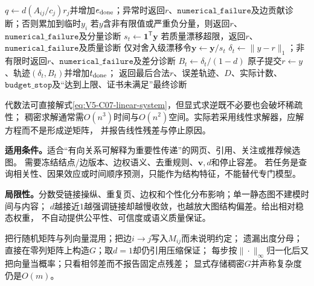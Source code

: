 \begin{AlgorithmContract}
\begin{algorithm}[tbp]
{{    $q\leftarrow d(A_{ij}/c_j)r_j$并增加$e_{\rm done}$；异常时返回$r$、$\mathtt{numerical\_failure}$及边贡献诊断；否则累加到临时$y_i$\;
  }
  若$y$含非有限值或严重负分量，则返回$r$、$\mathtt{numerical\_failure}$及分量诊断\;
  $s_t\leftarrow\boldsymbol1^{\mathsf T}\boldsymbol y$\;
  若质量漂移超限，返回$r$、$\mathtt{numerical\_failure}$及质量诊断\;
  仅对舍入级漂移令$\boldsymbol y\leftarrow\boldsymbol y/s_t$\;
  $\delta_t\leftarrow\|y-r\|_1$；非有限时返回$r$、$\mathtt{numerical\_failure}$及差分诊断\;
  $B_t\leftarrow\delta_t/(1-d)$\;
  原子提交$r\leftarrow y$、轨迹$(\delta_t,B_t)$并增加$t_{\rm done}$；
}
返回最后合法$r$、误差轨迹、$D$、实际计数、$\mathtt{budget\_stop}$及“达到上限、证书未满足”最终诊断\;
\end{algorithm}
\end{AlgorithmContract}
\FloatBarrier
{}
\endgroup

代数法可直接解式\eqref{eq:V5-C07-linear-system}，但显式求逆既不必要也会破坏稀疏性；
稠密求解通常需$O(n^3)$时间与$O(n^2)$空间。实际若采用线性求解器，应解方程而不是形成逆矩阵，
并报告线性残差与停止原因。

\label{struct:V5-C07-CH28}
\textbf{适用条件。}\PageRank{}适合“有向关系可解释为重要性传递”的网页、引用、关注或推荐候选图。
需要冻结结点/边版本、边权语义、去重规则、$\boldsymbol v,d$和停止容差。
若任务是查询相关性、因果效应或时间顺序预测，\PageRank{}只能作为结构特征，不能替代专门模型。

\label{struct:V5-C07-CH29}
\textbf{局限性。}分数受链接操纵、重复页、边权和个性化分布影响；单一静态图不建模时间与内容；
$d$越接近$1$越强调链接却越慢收敛，也越放大图结构偏差。\PageRank{}给出相对稳态权重，
不自动提供公平性、可信度或语义质量保证。

\label{struct:V5-C07-CH30}
\begin{pitfallbox}
把行随机矩阵与列向量混用；把边$i\to j$写入$M_{ij}$而未说明约定；
遗漏出度分母；直接在零列矩阵上构造$G$；取$d=1$却仍引用压缩保证；
每步按$\|\cdot\|_\infty$归一化后又把向量当概率；只看相邻差而不报告固定点残差；
显式存储稠密$G$并声称复杂度仍是$O(m)$。
\end{pitfallbox}

